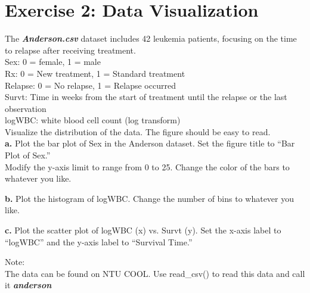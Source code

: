 \documentclass[12pt,letterpaper]{article}
\begin{document}
\section*{Exercise 2: Data Visualization}
The \textit{\textbf{Anderson.csv}} dataset includes 42 leukemia patients, focusing on the time to relapse after receiving treatment. \\
Sex: 0 = female, 1 = male\\
Rx: 0 = New treatment, 1 = Standard treatment\\
Relapse: 0 = No relapse, 1 = Relapse occurred\\
Survt: Time in weeks from the start of treatment until the relapse or the last observation\\
logWBC: white blood cell count (log transform) \\

Visualize the distribution of the data. The figure should be easy to read.\\

\textbf{a.} Plot the bar plot of Sex in the Anderson dataset. Set the figure title to “Bar Plot of Sex.” \\
Modify the y-axis limit to range from 0 to 25. Change the color of the bars to whatever you like.

\textbf{b.} Plot the histogram of logWBC. Change the number of bins to whatever you like.

\textbf{c.} Plot the scatter plot of logWBC (x) vs. Survt (y). Set the x-axis label to “logWBC” and the y-axis label to “Survival Time.”

Note: \\
The data can be found on NTU COOL. Use read\_csv() to read this data and call it \textit{\textbf{anderson}}
\end{document}

